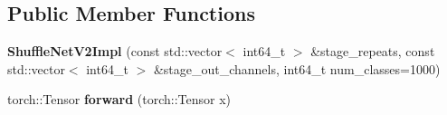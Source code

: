 \subsection*{Public Member Functions}
\begin{DoxyCompactItemize}
\item 
\mbox{\label{structvision_1_1models_1_1ShuffleNetV2Impl_a1611baeee643035470400c025384c403}} 
{\bfseries Shuffle\+Net\+V2\+Impl} (const std\+::vector$<$ int64\+\_\+t $>$ \&stage\+\_\+repeats, const std\+::vector$<$ int64\+\_\+t $>$ \&stage\+\_\+out\+\_\+channels, int64\+\_\+t num\+\_\+classes=1000)
\item 
\mbox{\label{structvision_1_1models_1_1ShuffleNetV2Impl_a2168fb0a08bee9aa16ff291fc3f04b64}} 
torch\+::\+Tensor {\bfseries forward} (torch\+::\+Tensor x)
\end{DoxyCompactItemize}
